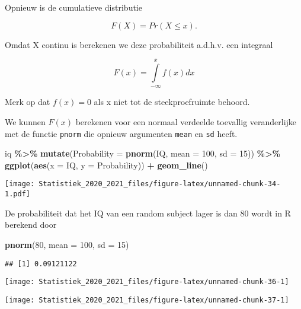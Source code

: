 \documentclass[
  12pt,dutch,coursenotes]{book}
\newenvironment{Shaded}{\begin{snugshade}}{\end{snugshade}}
\newcommand{\DataTypeTok}[1]{\textcolor[rgb]{0.13,0.29,0.53}{#1}}
\newcommand{\DecValTok}[1]{\textcolor[rgb]{0.00,0.00,0.81}{#1}}
\newcommand{\KeywordTok}[1]{\textcolor[rgb]{0.13,0.29,0.53}{\textbf{#1}}}
\newcommand{\NormalTok}[1]{#1}
\newcommand{\OperatorTok}[1]{\textcolor[rgb]{0.81,0.36,0.00}{\textbf{#1}}}
\newcommand{\StringTok}[1]{\textcolor[rgb]{0.31,0.60,0.02}{#1}}
\theoremstyle{definition}
\theoremstyle{definition}
\theoremstyle{definition}
\theoremstyle{remark}
\begin{document}
Opnieuw is de cumulatieve distributie

\[F(X)=Pr(X\leq x).\]

Omdat X continu is berekenen we deze probabiliteit a.d.h.v. een integraal

\[F(x)=\int \limits_{-\infty}^x f(x) dx\]

Merk op dat \(f(x)=0\) als x niet tot de steekproefruimte behoord.

We kunnen \(F(x)\) berekenen voor een normaal verdeelde toevallig veranderlijke met de functie \texttt{pnorm} die opnieuw argumenten \texttt{mean} en \texttt{sd} heeft.

\begin{Shaded}
\begin{Highlighting}[]
\NormalTok{iq }\OperatorTok{\%\textgreater{}\%}\StringTok{ }\KeywordTok{mutate}\NormalTok{(}\DataTypeTok{Probability =} \KeywordTok{pnorm}\NormalTok{(IQ, }\DataTypeTok{mean =} \DecValTok{100}\NormalTok{, }\DataTypeTok{sd =} \DecValTok{15}\NormalTok{)) }\OperatorTok{\%\textgreater{}\%}\StringTok{ }
\StringTok{    }\KeywordTok{ggplot}\NormalTok{(}\KeywordTok{aes}\NormalTok{(}\DataTypeTok{x =}\NormalTok{ IQ, }\DataTypeTok{y =}\NormalTok{ Probability)) }\OperatorTok{+}\StringTok{ }\KeywordTok{geom\_line}\NormalTok{()}
\end{Highlighting}
\end{Shaded}

\texttt{[image: Statistiek\_2020\_2021\_files/figure-latex/unnamed-chunk-34-1.pdf]}

De probabiliteit dat het IQ van een random subject lager is dan 80 wordt in R berekend door

\begin{Shaded}
\begin{Highlighting}[]
\KeywordTok{pnorm}\NormalTok{(}\DecValTok{80}\NormalTok{, }\DataTypeTok{mean =} \DecValTok{100}\NormalTok{, }\DataTypeTok{sd =} \DecValTok{15}\NormalTok{)}
\end{Highlighting}
\end{Shaded}

\begin{verbatim}
## [1] 0.09121122
\end{verbatim}

\begin{center}\texttt{[image: Statistiek\_2020\_2021\_files/figure-latex/unnamed-chunk-36-1]} \end{center}

\begin{center}\texttt{[image: Statistiek\_2020\_2021\_files/figure-latex/unnamed-chunk-37-1]} \end{center}
\end{document}
